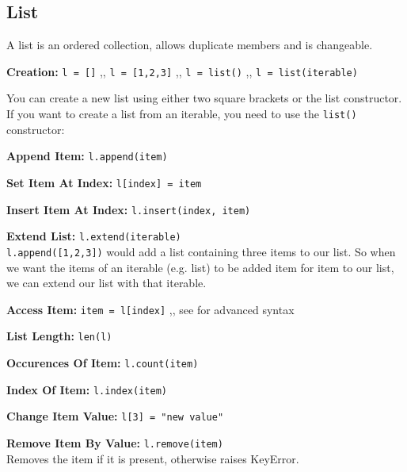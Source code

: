 \subsection{List} \label{List}
    A list is an ordered collection, allows duplicate members and is changeable.

    \begin{indentblock}

        \textbf{Creation:} \texttt{l = []} \sep{,} \texttt{l = [1,2,3]}
        \sep{,} \texttt{l = list()} \sep{,} \texttt{l = list(iterable)}

        You can create a new list using either two square brackets or the list constructor.
        If you want to create a list from an iterable, you need to use the
        \texttt{list()} constructor:


        \textbf{Append Item:} \texttt{l.append(item)}

        \textbf{Set Item At Index:} \texttt{l[index] = item}

        \textbf{Insert Item At Index:} \texttt{l.insert(index, item)}

        \textbf{Extend List:} \texttt{l.extend(iterable)} \\
        \texttt{l.append([1,2,3])} would add a list containing three items to our list.
        So when we want the items of an iterable (e.g. list) to be added item for item to our list,
        we can extend our list with that iterable.


        \textbf{Access Item:} \texttt{item = l[index]} \sep{,}
        see  for advanced syntax

        \textbf{List Length:} \texttt{len(l)}

        \textbf{Occurences Of Item:} \texttt{l.count(item)}

        \textbf{Index Of Item:} \texttt{l.index(item)}

        \textbf{Change Item Value:} \texttt{l[3] = "new value"}

        \textbf{Remove Item By Value:} \texttt{l.remove(item)} \\
        Removes the item if it is present, otherwise raises KeyError.


\end{indentblock}
